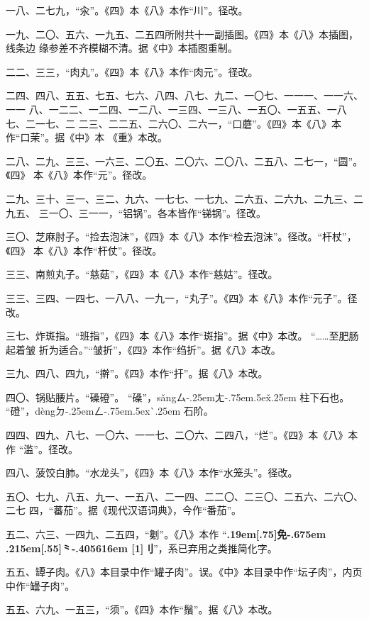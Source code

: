 \begin{list}{}
一八、二七九，“汆”。《四》本《八》本作“川”。径改。

一九、二〇、五六、一九五、二五四所附共十一副插图。《四》本《八》本插图，线条边
缘参差不齐模糊不清。据《中》本插图重制。

二二、三三，“肉丸”。《四》本《八》本作“肉元”。径改。

二四、四八、五五、七五、七六、八四、八七、九二、一〇七、一一一、一一六、一一
八、一二二、一二四、一二八、一三四、一三八、一五〇、一五五、一八七、二一七、二
二三、二二五、二六〇、二六一，“口蘑”。《四》本《八》本作“口茉”。据《中》本
《重》本改。

二八、二九、三三、一六三、二〇五、二〇六、二〇八、二五八、二七一，“圆”。《四》
本《八》本作“元”。径改。

二九、三十、三一、三二、九六、一七七、一七九、二六五、二六九、二九三、二九五、
三一〇、三一一，“铝锅”。各本皆作“锑锅”。径改。

三〇、芝麻肘子。“捡去泡沫”，《四》本《八》本作“检去泡沫”。径改。“杆杖”，《四》
本《八》本作“杆仗”。径改。

三三、南煎丸子。“慈菇”，《四》本《八》本作“慈姑”。径改。

三三、三四、一四七、一八八、一九一，“丸子”。《四》本《八》本作“元子”。径改。

三七、炸斑指。“班指”，《四》本《八》本作“斑指”。据《中》本改。 “……至肥肠起着皱
折为适合。”“皱折”，《四》本作“绉折”。据《八》本改。

三九、四八、四九，“擀”。《四》本作“扞”。据《八》本改。

四〇、锅贴腰片。“磉磴”。
“磉”，{s\v{a}ng}{ㄙ\kern-.25emㄤ\kern-.75em\raise.5ex\hbox{\v{}}\kern.25em}
柱下石也。
“磴”，{d\`{e}ng}{ㄉ\kern-.25emㄥ\kern-.75em\raise.5ex\hbox{\`{}}\kern.25em}
石阶。

四四、四九、八七、一〇六、一一七、二〇六、二四八，“烂”。《四》本《八》本作
“滥”。径改。

四八、菠饺白肺。“水龙头”，《四》本《八》本作“水笼头”。径改。

五〇、七九、八五、九一、一五八、二一四、二二〇、二三〇、二五六、二六〇、二七
四，“蕃茄”。据《现代汉语词典》，今作“番茄”。

五二、六三、一四九、二五四，“劖”。《八》本作
“{\bfseries\raise.19em\hbox{\scalebox{.675}[.75]{免}}\kern-.675em%
\lower.215em\hbox{\scalebox{.95}[.55]{⺀}}\kern-.405616em%
\scalebox{.65}[1]{刂}}”，系已弃用之类推简化字。

五五、罈子肉。《八》本目录中作“罐子肉”。误。《中》本目录中作“坛子肉”，内页
中作“罎子肉”。

五五、六九、一五三，“须”。《四》本作“鬚”。据《八》本改。


\end{list}

